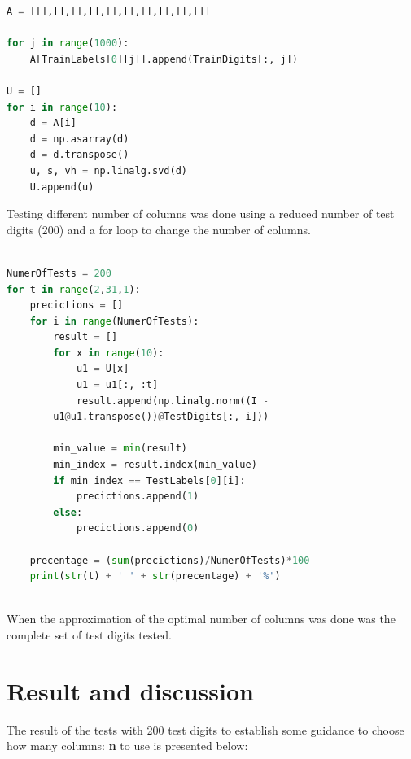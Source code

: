 \documentclass[a4paper]{article}
\begin{document}
\begin{lstlisting}[language=Python]
A = [[],[],[],[],[],[],[],[],[],[]]

for j in range(1000):
    A[TrainLabels[0][j]].append(TrainDigits[:, j])

U = []
for i in range(10):
    d = A[i]
    d = np.asarray(d)
    d = d.transpose()
    u, s, vh = np.linalg.svd(d)
    U.append(u)

\end{lstlisting}

Testing different number of columns was done using a reduced number of test digits (200) and a for loop to change the number of columns. 



\begin{lstlisting}[language=Python]

NumerOfTests = 200
for t in range(2,31,1):
    precictions = []
    for i in range(NumerOfTests):
        result = []
        for x in range(10):
            u1 = U[x]
            u1 = u1[:, :t]
            result.append(np.linalg.norm((I - 
	    u1@u1.transpose())@TestDigits[:, i]))

        min_value = min(result)
        min_index = result.index(min_value)
        if min_index == TestLabels[0][i]:
            precictions.append(1)
        else:
            precictions.append(0)

    precentage = (sum(precictions)/NumerOfTests)*100
    print(str(t) + ' ' + str(precentage) + '%')
	
\end{lstlisting}
When the approximation of the optimal number of columns was done was the complete set of test digits tested.

\section*{Result and discussion}
The result of the tests with 200 test digits to establish some guidance to choose how many columns: \textbf{n}  to use is presented below:

\newpage
\end{document}
